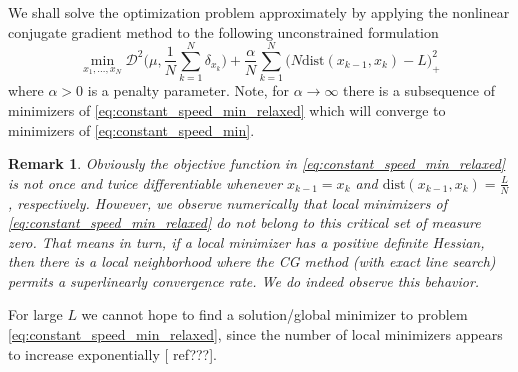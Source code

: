 \documentclass[draft,
a4paper,11pt,DIV=11,%
abstract=on%
]{scrartcl}
\newtheorem{remark}[thm]{Remark}
\begin{document}
We shall solve the optimization problem approximately by applying the nonlinear conjugate gradient method to the following unconstrained formulation
\begin{equation}
  \label{eq:constant_speed_min_relaxed}
  \min_{x_{1},\dots,x_{N}} \mathscr{D}^{2} \Big(\mu, \frac{1}{N} \sum_{k=1}^{N} \delta_{x_{k}}\Big) +   \frac{\alpha}{N} \sum_{k=1}^{N} \big(N \mathrm{dist}(x_{k-1},x_{k}) - L \big)_{+}^{2}
\end{equation}
where $\alpha > 0$ is a penalty parameter. Note, for $\alpha \to \infty$ there is a subsequence of minimizers of \eqref{eq:constant_speed_min_relaxed} which will converge to minimizers of \eqref{eq:constant_speed_min}.

\begin{remark}
  Obviously the objective function in \eqref{eq:constant_speed_min_relaxed} is not once and twice differentiable whenever $x_{k-1}=x_{k}$ and $\mathrm{dist}(x_{k-1},x_{k}) = \frac{L}{N}$, respectively. However, we observe numerically that local minimizers of \eqref{eq:constant_speed_min_relaxed} do not belong to this critical set of measure zero. That means in turn, if a local minimizer has a positive definite Hessian, then there is a local neighborhood where the CG method (with exact line search) permits a superlinearly convergence rate. We do indeed observe this behavior.
\end{remark}
For large $L$ we cannot hope to find a solution/global minimizer to problem \eqref{eq:constant_speed_min_relaxed}, since the number of local minimizers appears to increase exponentially {\color{blue}[ ref???]}.
\end{document}
